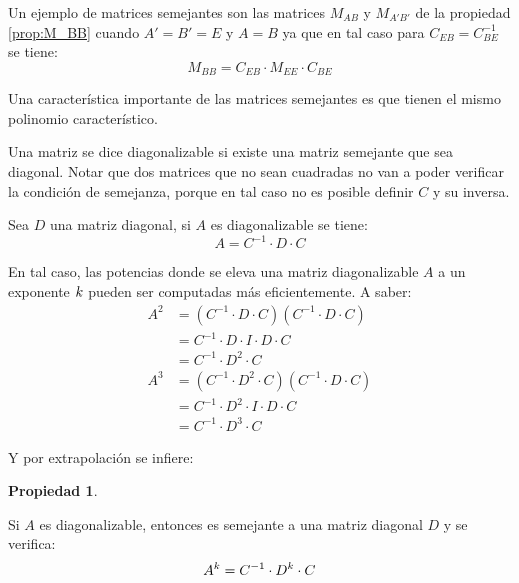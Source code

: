 \documentclass[a5paper,12pt,twoside]{book}
\newtheorem{prop}{{Propiedad}}[chapter]
\begin{document}
Un ejemplo de matrices semejantes son las matrices $M_{AB}$ y $M_{A'B'}$ de la propiedad \ref{prop:M_BB} cuando $A'=B'=E$ y $A=B$ ya que en tal caso para $C_{EB}=C_{BE}^{-1}$ se tiene:
\begin{equation*}
    M_{BB} = C_{EB} \cdot M_{EE} \cdot C_{BE}
\end{equation*}

Una característica importante de las matrices semejantes es que tienen el mismo polinomio característico.

Una matriz se dice diagonalizable si existe una matriz semejante que sea diagonal.
Notar que dos matrices que no sean cuadradas no van a poder verificar la condición de semejanza, porque en tal caso no es posible definir $C$ y su inversa.

Sea $D$ una matriz diagonal, si $A$ es diagonalizable se tiene:
\begin{equation*}
    A = C^{-1} \cdot D \cdot C
\end{equation*}

En tal caso, las potencias donde se eleva una matriz diagonalizable $A$ a un exponente $k$ pueden ser computadas más eficientemente.
A saber:
\begin{align*}
    A^2 &= \left( C^{-1} \cdot D \cdot C \right) \left( C^{-1} \cdot D \cdot C \right)
    \\
    &= C^{-1} \cdot D \cdot I \cdot D \cdot C
    \\
    &= C^{-1} \cdot D^2 \cdot C
    \\[1ex]
    A^3 &= \left( C^{-1} \cdot D^2 \cdot C \right) \left( C^{-1} \cdot D \cdot C \right)
    \\
    &= C^{-1} \cdot D^2 \cdot I \cdot D \cdot C
    \\
    &= C^{-1} \cdot D^3 \cdot C
\end{align*}

Y por extrapolación se infiere:

\begin{mdframed}[style=PropertyFrame]
    \begin{prop}
    \end{prop}
    Si $A$ es diagonalizable, entonces es semejante a una matriz diagonal $D$ y se verifica:
    \begin{equation*}
        A^k = C^{-1} \cdot D^k \cdot C
    \end{equation*}
\end{mdframed}
\end{document}
